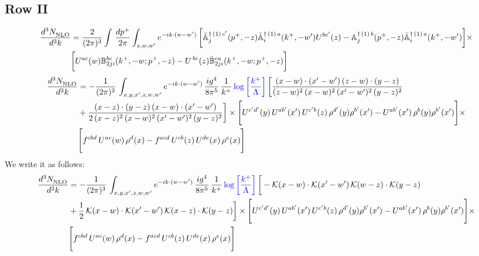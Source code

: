 \documentclass[9pt]{article}
\def\mf#1{\mathbb{#1}}
\numberwithin{equation}{section}
\begin{document}
\subsection{Row II}
\begin{align}
    \frac{d^{3}N_{\rm NLO}^{\rm}}{d^{3}k}  & =    \frac{2}{(2\pi)^{3}} \int\, \frac{dp^{+}}{2\pi}\int_{z,w,w^{\prime}} e^{-ik\cdot (w-w')}\,\bigg[\Bar{\mf{A}}^{\dagger\,(1)\, c^{\prime}}_{j}(p^{+},-z)\Bar{\mf{A}}^{\dagger\, (1)\, a}_{i}(k^{+},- w^{\prime})U^{bc^{\prime}}(z) - \mf{A}^{\dagger\, (1)\, b}_{j}(p^{+},- z)\Bar{\mf{A}}^{\dagger\, (1)\, a}_{i}(k^{+},- w^{\prime})\bigg] \times \notag \\ & \bigg[U^{ac}(w) \mf{B}^{bc}_{2ji}(k^{+},-w;p^{+},-z) -U^{\, bc}(z)\Bar{\mf{B}}^{ca}_{2ji}(k^{+},-w; p^{+},-z)\bigg] \nonumber
\end{align}
\begin{align}
 \frac{d^{3}N_{\rm NLO}^{\rm}}{d^{3}k}  & =    -\frac{1}{(2\pi)^{3}}\, \int_{x,y,x',z,w,w^{\prime}} e^{-ik\cdot (w-w')}\,\frac{ig^{4}}{8\pi^{5}}\,\frac{1}{k^{+}}\,{\color{blue}\log{\left[\frac{k^{+}}{\Lambda}\right]}}\,\bigg[\frac{(x-w)\cdot (x'-w')\,(z-w)\cdot (y-z)}{(z-w)^{2}\,(x-w)^{2}\,(x'-w')^{2}\,(y-z)^{2}}\notag \\ & +\frac{(x-z)\cdot (y-z)\,(x-w)\cdot (x'-w')}{2\,(x-z)^{2}\, (x-w)^{2}\,(x'-w')^{2}\,(y-z)^{2}}\bigg]\times\Bigg[U^{c'd'}(y)\,U^{ab'}(x')\,U^{c'b}(z)\,\rho^{d'}(y)\rho^{b'}(x')-U^{ab'}(x')\,\rho^{b}(y)\rho^{b'}(x')\Bigg]\times\notag \\ & \Bigg[f^{cbd}\,U^{ac}(w)\,\rho^{d}(x)-f^{acd}\, U^{cb}(z)\,U^{de}(x)\,\rho^{e}(x)\Bigg]
\end{align}
We write it as follows:
\begin{align}
 \frac{d^{3}N_{\rm NLO}^{\rm}}{d^{3}k}  & =    -\frac{1}{(2\pi)^{3}}\, \int_{x,y,x',z,w,w^{\prime}} e^{-ik\cdot (w-w')}\,\frac{ig^{4}}{8\pi^{5}}\,\frac{1}{k^{+}}\,{\color{blue}\log{\left[\frac{k^{+}}{\Lambda}\right]}}\,\bigg[-\mathcal{K}(x-w)\cdot \mathcal{K}(x'-w')\, \mathcal{K}(w-z)\cdot \mathcal{K}(y-z)\notag \\ & +\frac{1}{2}\,\mathcal{K}(x-w)\cdot \mathcal{K}(x'-w')\, \mathcal{K}(x-z)\cdot \mathcal{K}(y-z)\bigg]\times\Bigg[U^{c'd'}(y)\,U^{ab'}(x')\,U^{c'b}(z)\,\rho^{d'}(y)\rho^{b'}(x')-U^{ab'}(x')\,\rho^{b}(y)\rho^{b'}(x')\Bigg]\times\notag \\ & \Bigg[f^{cbd}\,U^{ac}(w)\,\rho^{d}(x)-f^{acd}\, U^{cb}(z)\,U^{de}(x)\,\rho^{e}(x)\Bigg]
\end{align}
\end{document}
